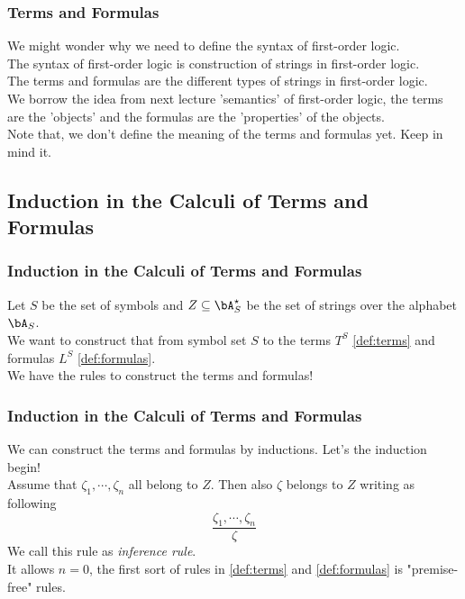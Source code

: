 \begin{frame}
    \frametitle{Terms and Formulas}
    
    We might wonder why we need to define the syntax of first-order logic. \\
    \bigskip
    \pause
    The syntax of first-order logic is construction of strings in first-order logic. \\
    The terms and formulas are the different types of strings in first-order logic. \\
    \bigskip
    \pause
    We borrow the idea from next lecture 'semantics' of first-order logic, the terms are the 'objects' and the formulas are the 'properties' of the objects. \\
    Note that, we don't define the meaning of the terms and formulas yet. Keep in mind it. \\
\end{frame}

\subsection{Induction in the Calculi of Terms and Formulas}

\begin{frame}
    \frametitle{Induction in the Calculi of Terms and Formulas}

    Let $S$ be the set of symbols and $Z \subseteq \bA_S^{\star}$ be the set of strings over the alphabet $\bA_S$. \\
    \bigskip
    \pause
    We want to construct that from symbol set $S$ to the terms $T^S$ \ref{def:terms} and formulas $L^S$ \ref{def:formulas}. \\
    We have the rules to construct the terms and formulas!
\end{frame}

\begin{frame}
    \frametitle{Induction in the Calculi of Terms and Formulas}
    
    We can construct the terms and formulas by inductions. Let's the induction begin! \\
    \bigskip
    \pause
    Assume that $\zeta_1, \cdots , \zeta_n$ all belong to $Z$. Then also $\zeta$ belongs to $Z$ writing as following \\
    \begin{equation}
        \frac{\zeta_1, \cdots , \zeta_n}{\zeta}
    \end{equation}
    \bigskip
    \pause
    We call this rule as \textit{inference rule}. \\
    It allows $n=0$, the first sort of rules in \ref{def:terms} and \ref{def:formulas} is "premise-free" rules. \\
\end{frame}

